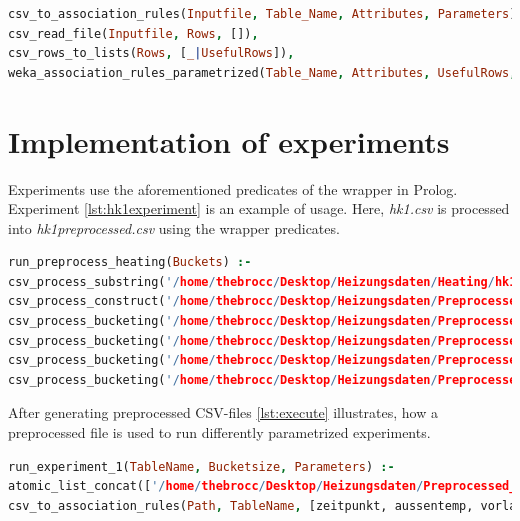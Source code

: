 \documentclass[bachelor,english]{info1thesis}
\begin{document}
\begin{lstlisting}[language=Prolog, caption= Implementation of predicate which generates association rules from CSV-files in Prolog, label={lst:rules}]
csv_to_association_rules(Inputfile, Table_Name, Attributes, Parameters) :-
csv_read_file(Inputfile, Rows, []),
csv_rows_to_lists(Rows, [_|UsefulRows]),
weka_association_rules_parametrized(Table_Name, Attributes, UsefulRows, Rules, Parameters).
\end{lstlisting}

\section{Implementation of experiments}
Experiments use the aforementioned predicates of the wrapper in Prolog. Experiment \ref{lst:hk1experiment} is an example of usage. Here, \textit{hk1.csv} is processed into \textit{hk1preprocessed.csv} using the wrapper predicates.


\begin{lstlisting}[language=Prolog, caption= Implementation of heating preprocessing, label={lst:hk1experiment}]
run_preprocess_heating(Buckets) :-
csv_process_substring('/home/thebrocc/Desktop/Heizungsdaten/Heating/hk1.csv', 0, 0, 15, '/home/thebrocc/Desktop/Heizungsdaten/Preprocessed/Heating/hk1first.csv'),
csv_process_construct('/home/thebrocc/Desktop/Heizungsdaten/Preprocessed/Heating/hk1first.csv', 2, 3, 'sub', 'spreizung', '/home/thebrocc/Desktop/Heizungsdaten/Preprocessed/Heating/hk1second.csv'),
csv_process_bucketing('/home/thebrocc/Desktop/Heizungsdaten/Preprocessed/Heating/hk1second.csv', 1, Buckets, '/home/thebrocc/Desktop/Heizungsdaten/Preprocessed/Heating/hk1third.csv'),
csv_process_bucketing('/home/thebrocc/Desktop/Heizungsdaten/Preprocessed/Heating/hk1third.csv', 2, Buckets, '/home/thebrocc/Desktop/Heizungsdaten/Preprocessed/Heating/hk1fourth.csv'),
csv_process_bucketing('/home/thebrocc/Desktop/Heizungsdaten/Preprocessed/Heating/hk1fourth.csv', 3, Buckets, '/home/thebrocc/Desktop/Heizungsdaten/Preprocessed/Heating/hk1fifth.csv'),
csv_process_bucketing('/home/thebrocc/Desktop/Heizungsdaten/Preprocessed/Heating/hk1fifth.csv', 4, Buckets, '/home/thebrocc/Desktop/Heizungsdaten/Preprocessed/Heating/hk1preprocessed.csv')
\end{lstlisting}

After generating preprocessed CSV-files \ref{lst:execute} illustrates, how a preprocessed file is used to run differently parametrized experiments.


\begin{lstlisting}[language=Prolog, caption= Running parametrized experiments, label={lst:execute}]
run_experiment_1(TableName, Bucketsize, Parameters) :-
atomic_list_concat(['/home/thebrocc/Desktop/Heizungsdaten/Preprocessed_20k_', Bucketsize, 'Buckets/Heating/hk1preprocessed.csv'], '' , Path),
csv_to_association_rules(Path, TableName, [zeitpunkt, aussentemp, vorlauf, ruecklauf, spreizung] , Parameters).
\end{lstlisting}
\end{document}
